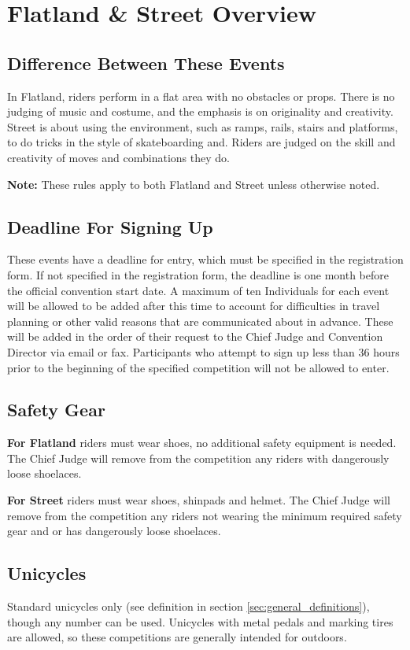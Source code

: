 \chapter{Flatland \& Street \label{chap:flat-street} Overview}

\section{Difference Between These Events}
In Flatland, riders perform in a flat area with no obstacles or props.
There is no judging of music and costume, and the emphasis is on originality and creativity.
Street is about using the environment, such as ramps, rails, stairs and platforms, to do tricks in the style of skateboarding and.
Riders are judged on the skill and creativity of moves and combinations they do.

\textbf{Note:} These rules apply to both Flatland and Street unless otherwise noted.

\section{Deadline For Signing Up}
These events have a deadline for entry, which must be specified in the registration form.
If not specified in the registration form, the deadline is one month before the official convention start date.
A maximum of ten Individuals for each event will be allowed to be added after this time to account for difficulties in travel planning or other valid reasons that are communicated about in advance.
These will be added in the order of their request to the Chief Judge and Convention Director via email or fax.
Participants who attempt to sign up less than 36 hours prior to the beginning of the specified competition will not be allowed to enter.

\section{Safety Gear}
\textbf{For Flatland} riders must wear shoes, no additional safety equipment is needed.
The Chief Judge will remove from the competition any riders with dangerously loose shoelaces. 

\textbf{For Street} riders must wear shoes, shinpads and helmet.
The Chief Judge will remove from the competition any riders not wearing the minimum required safety gear and or has dangerously loose shoelaces.

\section{Unicycles}
Standard unicycles only (see definition in section \ref{sec:general_definitions}), though any number can be used.
Unicycles with metal pedals and marking tires are allowed, so these competitions are generally intended for outdoors.

